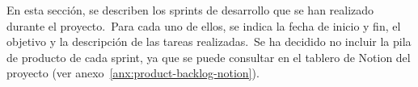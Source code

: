 
En esta sección, se describen los sprints de desarrollo que se han realizado durante el proyecto.\ Para cada uno de
ellos, se indica la fecha de inicio y fin, el objetivo y la descripción de las tareas realizadas.\ Se ha decidido
no incluir la pila de producto de cada sprint, ya que se puede consultar en el tablero de Notion del
proyecto (ver anexo~\ref{anx:product-backlog-notion}).












